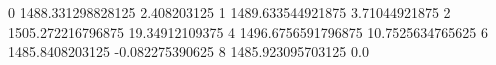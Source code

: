 0 1488.331298828125 2.408203125
1 1489.633544921875 3.71044921875
2 1505.272216796875 19.34912109375
4 1496.6756591796875 10.7525634765625
6 1485.8408203125 -0.082275390625
8 1485.923095703125 0.0
